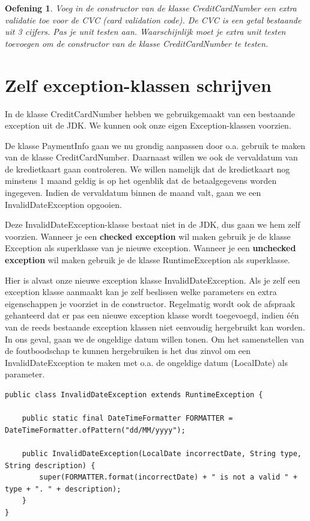 \documentclass{tstextbook}
\newtheorem{envoefening}{Oefening}[chapter]
\newenvironment{oefening}
               {\begin{boxexercise}\begin{envoefening}}
               {\end{envoefening}\end{boxexercise}}
\begin{document}
\begin{oefening}
Voeg in de constructor van de klasse CreditCardNumber een extra validatie toe voor de CVC (card validation code). De CVC is een getal bestaande uit 3 cijfers.
Pas je unit testen aan. Waarschijnlijk moet je extra unit testen toevoegen om de constructor van de klasse CreditCardNumber te testen.
\end{oefening}


\section{Zelf exception-klassen schrijven}

In de klasse CreditCardNumber hebben we gebruikgemaakt van een bestaande exception uit de JDK. We kunnen ook onze eigen Exception-klassen voorzien.

De klasse PaymentInfo gaan we nu grondig aanpassen door o.a. gebruik te maken van de klasse CreditCardNumber. Daarnaast willen we ook de vervaldatum van de kredietkaart gaan controleren. We willen namelijk dat de kredietkaart nog minstens 1 maand geldig is op het ogenblik dat de betaalgegevens worden ingegeven. Indien de vervaldatum binnen de maand valt, gaan we een InvalidDateException opgooien.

Deze InvalidDateException-klasse bestaat niet in de JDK, dus gaan we hem zelf voorzien. Wanneer je een \textbf{checked exception} wil maken gebruik je de klasse Exception als superklasse van je nieuwe exception. Wanneer je een \textbf{unchecked exception} wil maken gebruik je de klasse RuntimeException als superklasse.

Hier is alvast onze nieuwe exception klasse InvalidDateException. Als je zelf een exception klasse aanmaakt kan je zelf beslissen welke parameters en extra eigenschappen je voorziet in de constructor. Regelmatig wordt ook de afspraak gehanteerd dat er pas een nieuwe exception klasse wordt toegevoegd, indien \'e\'en van de reeds bestaande exception klassen niet eenvoudig hergebruikt kan worden. In ons geval, gaan we de ongeldige datum willen tonen. Om het samenstellen van de foutboodschap te kunnen hergebruiken is het dus zinvol om een InvalidDateException te maken met o.a. de ongeldige datum (LocalDate) als parameter.

\begin{lstlisting}
public class InvalidDateException extends RuntimeException {

	public static final DateTimeFormatter FORMATTER = DateTimeFormatter.ofPattern("dd/MM/yyyy");

	public InvalidDateException(LocalDate incorrectDate, String type, String description) {
		super(FORMATTER.format(incorrectDate) + " is not a valid " + type + ". " + description);
	}
}
\end{lstlisting}
\end{document}
